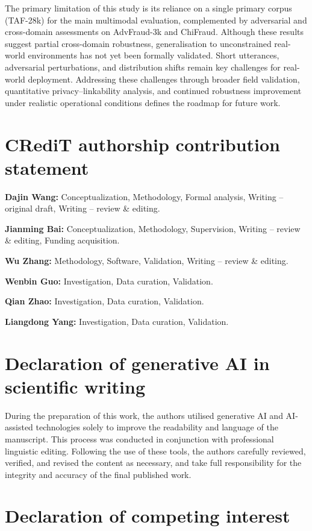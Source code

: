 \documentclass[a4paper,fleqn]{cas-sc}
\begin{document}
The primary limitation of this study is its reliance on a single primary corpus (TAF-28k) for the main multimodal evaluation, complemented by adversarial and cross-domain assessments on AdvFraud-3k and ChiFraud. Although these results suggest partial cross-domain robustness, generalisation to unconstrained real-world environments has not yet been formally validated. Short utterances, adversarial perturbations, and distribution shifts remain key challenges for real-world deployment. Addressing these challenges through broader field validation, quantitative privacy--linkability analysis, and continued robustness improvement under realistic operational conditions defines the roadmap for future work.

\section*{CRediT authorship contribution statement}

\textbf{Dajin Wang:} Conceptualization, Methodology, Formal analysis, Writing -- original draft, Writing -- review \& editing.

\textbf{Jianming Bai:} Conceptualization, Methodology, Supervision, Writing -- review \& editing, Funding acquisition.

\textbf{Wu Zhang:} Methodology, Software, Validation, Writing -- review \& editing.

\textbf{Wenbin Guo:} Investigation, Data curation, Validation.

\textbf{Qian Zhao:} Investigation, Data curation, Validation.

\textbf{Liangdong Yang:} Investigation, Data curation, Validation.

\section*{Declaration of generative AI in scientific writing}

During the preparation of this work, the authors utilised generative AI and AI-assisted technologies solely to improve the readability and language of the manuscript. This process was conducted in conjunction with professional linguistic editing. Following the use of these tools, the authors carefully reviewed, verified, and revised the content as necessary, and take full responsibility for the integrity and accuracy of the final published work.

\section*{Declaration of competing interest}
\end{document}
